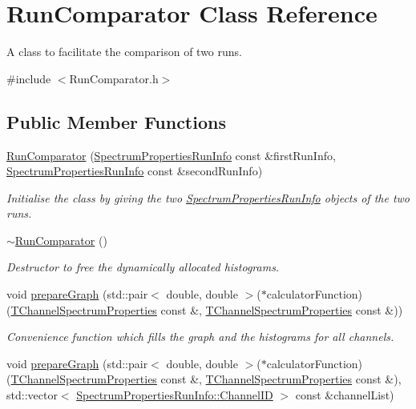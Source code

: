 \hypertarget{class_run_comparator}{
\section{RunComparator Class Reference}
\label{class_run_comparator}
}


A class to facilitate the comparison of two runs.  


{\ttfamily \#include $<$RunComparator.h$>$}\subsection*{Public Member Functions}
\begin{DoxyCompactItemize}
\item 
\hyperlink{class_run_comparator_ad66bf8c2b9402ed2f00f69afcc6e8bd6}{RunComparator} (\hyperlink{class_spectrum_properties_run_info}{SpectrumPropertiesRunInfo} const \&firstRunInfo, \hyperlink{class_spectrum_properties_run_info}{SpectrumPropertiesRunInfo} const \&secondRunInfo)
\begin{DoxyCompactList}\small\item\em Initialise the class by giving the two \hyperlink{class_spectrum_properties_run_info}{SpectrumPropertiesRunInfo} objects of the two runs. \item\end{DoxyCompactList}\item 
\hyperlink{class_run_comparator_a6df76f47b1cd9e6da5615814f3f631c5}{$\sim$RunComparator} ()
\begin{DoxyCompactList}\small\item\em Destructor to free the dynamically allocated histograms. \item\end{DoxyCompactList}\item 
void \hyperlink{class_run_comparator_a31b28d33c185a2be5a17c42525dd2ec0}{prepareGraph} (std::pair$<$ double, double $>$($\ast$calculatorFunction)(\hyperlink{class_t_channel_spectrum_properties}{TChannelSpectrumProperties} const \&, \hyperlink{class_t_channel_spectrum_properties}{TChannelSpectrumProperties} const \&))
\begin{DoxyCompactList}\small\item\em Convenience function which fills the graph and the histograms for all channels. \item\end{DoxyCompactList}\item 
void \hyperlink{class_run_comparator_a23682ec1792eea496942f83d8b9a36e8}{prepareGraph} (std::pair$<$ double, double $>$($\ast$calculatorFunction)(\hyperlink{class_t_channel_spectrum_properties}{TChannelSpectrumProperties} const \&, \hyperlink{class_t_channel_spectrum_properties}{TChannelSpectrumProperties} const \&), std::vector$<$ \hyperlink{class_spectrum_properties_run_info_1_1_channel_i_d}{SpectrumPropertiesRunInfo::ChannelID} $>$ const \&channelList)

\end{DoxyCompactItemize}
